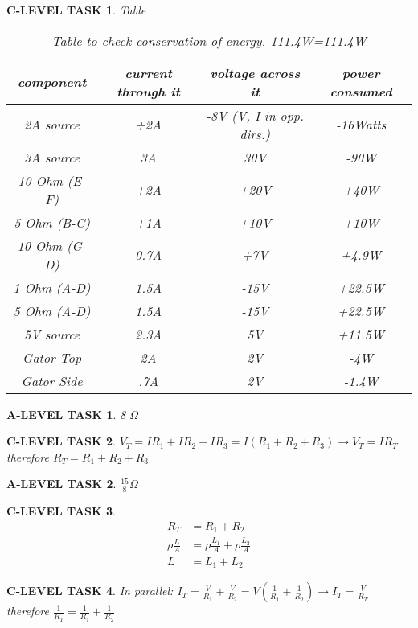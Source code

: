 \documentclass{book}
\numberwithin{equation}{section}
\newtheorem{alevel}{A-LEVEL TASK}
\newtheorem{clevel}{C-LEVEL TASK}
\theoremstyle{definition}
\begin{document}
\begin{clevel}Table\par
\begin{table}[H]
\begin{center}
\begin{tabular}{|c|c|c|c|} \hline
component &	current through it	& voltage across it	& power consumed \\ \hline
2A source	&+2A			&-8V (V, I in opp. dirs.)	&-16Watts\\ \hline
3A source	&3A			&30V	&-90W	\\ \hline
10 Ohm (E-F)	&+2A			&+20V	&+40W	\\ \hline
5 Ohm (B-C)	&+1A			&+10V	&+10W	\\ \hline
10 Ohm (G-D)	&0.7A			&+7V	&+4.9W	\\ \hline
1 Ohm (A-D)	&1.5A			&-15V	&+22.5W	\\ \hline
5 Ohm (A-D)	&1.5A			&-15V	&+22.5W	\\ \hline
5V source	&2.3A			&5V	&+11.5W	\\ \hline
Gator Top	&2A			&2V	&-4W	\\ \hline
Gator Side	&.7A			&2V	&-1.4W	\\ \hline
\end{tabular}
\caption{Table to check conservation of energy. 111.4W=111.4W}
\label{F:3CKT3}
\end{center}
\end{table}
\end{clevel}

\begin{alevel} 8 $\Omega$ \end{alevel}

\begin{clevel}$V_T=IR_1+IR_2+IR_3 = I(R_1+R_2+R_3) \rightarrow V_T=IR_T$\\
therefore $R_T=R_1+R_2+R_3$
\end{clevel}

\begin{alevel} $\frac{15}{8} \Omega$ \end{alevel}

\begin{clevel}\begin{align*}
R_T&=R_1+R_2\\
\rho\frac{L}{A}&=\rho\frac{L_1}{A}+\rho\frac{L_2}{A}\\
L&=L_1+L_2
\end{align*}
\end{clevel}

\begin{clevel}In parallel: $I_T=\frac{V}{R_1}+\frac{V}{R_2} = V(\frac{1}{R_1}+\frac{1}{R_2}) \rightarrow I_T=\frac{V}{R_T}$\\
therefore $\frac{1}{R_T}=\frac{1}{R_1}+\frac{1}{R_2}$
\end{clevel}
\end{document}
